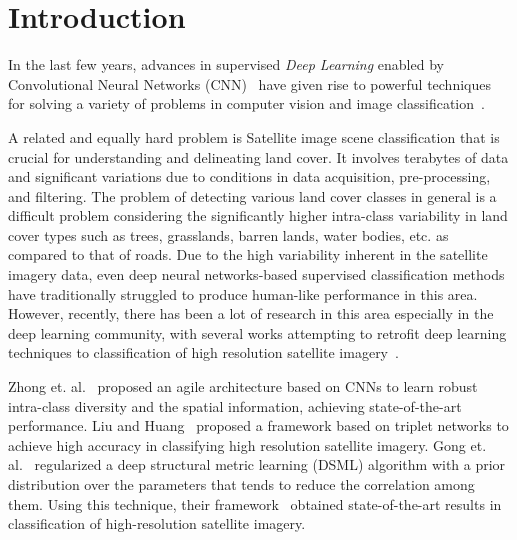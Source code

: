 \documentclass[]{interact}
\theoremstyle{plain}\newtheorem{theorem}{Theorem}[section]
\theoremstyle{definition}
\theoremstyle{remark}
\begin{document}
\section{Introduction}

In the last few years, advances in  supervised \emph{Deep Learning} enabled by Convolutional Neural Networks (CNN)~\citep{krizhevsky2012imagenet} have given rise to  powerful  techniques for  solving a variety of problems in computer vision and  image classification~\citep{krizhevsky2012imagenet}. 


A related and equally hard problem is Satellite image  scene classification that is crucial for understanding and  delineating land cover. It involves terabytes of data and significant variations due to conditions in data acquisition, pre-processing, and filtering. The problem of detecting various land cover classes in general is a difficult problem considering the significantly higher intra-class variability in land cover types such as trees, grasslands, barren lands, water bodies, etc. as compared to that of roads. Due to the high variability inherent in the satellite imagery data,  even deep neural networks-based   supervised classification methods have traditionally struggled to produce human-like performance in this area. However, recently,  there has been a lot of research in this area especially in the deep learning community, with several works attempting to retrofit deep learning techniques to classification of high resolution satellite imagery~\citep{gong2018diversity,basu2015,zhong2017satcnn, liu2018scene,simo2015discriminative,basutransaction}.

Zhong et. al.~\citep{zhong2017satcnn} proposed an agile architecture based on CNNs  to learn  robust intra-class diversity and the spatial information, achieving   state-of-the-art performance. Liu and Huang~\citep{liu2018scene} proposed a framework based on triplet networks to achieve high accuracy in classifying high resolution satellite imagery.  Gong et. al.~\citep{gong2018diversity} regularized a deep structural metric learning (DSML) algorithm with a prior distribution over the parameters that tends to reduce the correlation among them. Using this technique, their 
framework~\citep{gong2018diversity} obtained state-of-the-art results in classification of high-resolution satellite imagery.  
\end{document}
